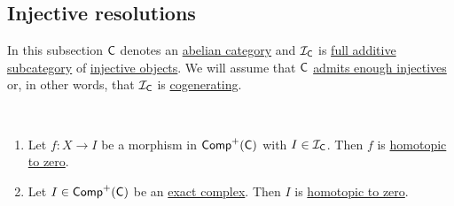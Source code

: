 \documentclass[../../main]{subfiles}
\begin{document}
\subsection{Injective resolutions}
In this subsection \(\category{C}\) denotes an \hyperref[def:abelian-category]{abelian category} and \(\mathcal{I}_{\category{C}}\) is \hyperref[def:full-additive-subcategory]{full additive subcategory} of \hyperref[def:injective-projective-objects]{injective objects}.
We will assume that \(\category{C}\) \hyperref[def:enough-injectives-projectives]{admits enough injectives} or, in other words, that \(\mathcal{I}_{\category{C}}\) is \hyperref[def:cogenerating-category]{cogenerating}.

\begin{proposition}~
  \begin{enumerate}
    \item Let \(f: X \to I\) be a morphism in \(\Complex[+]{\category{C}}\) with \(I \in \mathcal{I}_{\category{C}}\). Then \(f\) is \hyperref[def:homotopy]{homotopic to zero}.
    \item Let \(I \in \Complex[+]{\category{C}}\) be an \hyperref[def:exact-complex]{exact complex}.
          Then \(I\) is \hyperref[def:homotopy]{homotopic to zero}.
  \end{enumerate}
\end{proposition}
\end{document}
